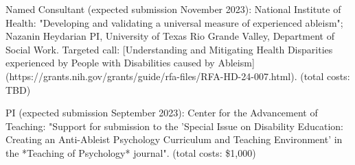 
\item Named Consultant (expected submission November 2023): National Institute of Health: "Developing and validating a universal measure of experienced ableism"; Nazanin Heydarian PI, University of Texas Rio Grande Valley, Department of Social Work. Targeted call: [Understanding and Mitigating Health Disparities experienced by People with Disabilities caused by Ableism](https://grants.nih.gov/grants/guide/rfa-files/RFA-HD-24-007.html). (total costs: TBD)

\item PI (expected submission September 2023):  Center for the Advancement of Teaching: "Support for submission to the 'Special Issue on Disability Education: Creating an Anti-Ableist Psychology Curriculum and Teaching Environment' in the *Teaching of Psychology* journal". (total costs: \$1,000)



%
%
